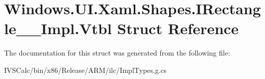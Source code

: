 \hypertarget{struct_windows_1_1_u_i_1_1_xaml_1_1_shapes_1_1_i_rectangle_____impl_1_1_vtbl}{}\section{Windows.\+U\+I.\+Xaml.\+Shapes.\+I\+Rectangle\+\_\+\+\_\+\+Impl.\+Vtbl Struct Reference}
\label{struct_windows_1_1_u_i_1_1_xaml_1_1_shapes_1_1_i_rectangle_____impl_1_1_vtbl}


The documentation for this struct was generated from the following file\+:\begin{DoxyCompactItemize}
\item 
I\+V\+S\+Calc/bin/x86/\+Release/\+A\+R\+M/ilc/Impl\+Types.\+g.\+cs\end{DoxyCompactItemize}
